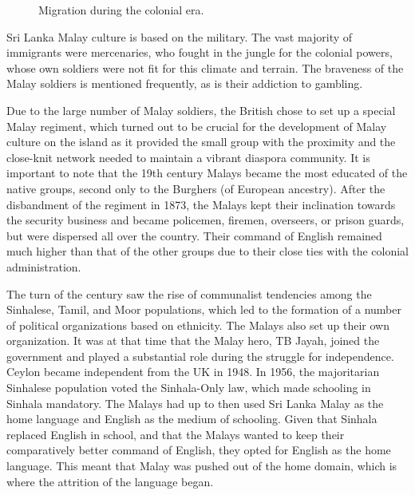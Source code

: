 \begin{figure}
\centering
{}
\caption{Migration during the colonial era.}
\end{figure}

Sri Lanka Malay culture is based on the military. The vast majority of immigrants were mercenaries, who fought in the jungle for the colonial powers, whose own soldiers were not fit for this climate and terrain. The braveness of the Malay soldiers is mentioned frequently, as is their addiction to gambling. 
 
Due to the large number of Malay soldiers, the British chose to set up  a special Malay regiment, which turned out to  be crucial for the development of Malay culture on the island \citep{Hussainmiya1987,Hussainmiya1990} as it provided the small group with the proximity and the close-knit network needed to maintain a vibrant diaspora community.  It is important to note that the 19th century Malays became the most educated of the native groups, second only to the Burghers (of European ancestry). After the disbandment of the regiment in 1873, the Malays kept their inclination towards the security  business and became policemen, firemen, overseers, or prison guards, but were dispersed all over the country. Their command of English remained much higher than that of the other groups due to their close ties with the colonial administration.

The turn of the century saw the rise of communalist tendencies among the Sinhalese, Tamil, and Moor populations, which led to the formation of a number of political organizations based on ethnicity. The Malays also set up their own  organization. It was at that time that the Malay hero, TB Jayah, joined the government and played a substantial role during the struggle for independence. Ceylon became independent from the UK in 1948. In 1956, the majoritarian Sinhalese population voted the Sinhala-Only law, which made schooling in Sinhala mandatory. The Malays had up to then used Sri Lanka Malay as the home language and English as the medium of schooling. Given that Sinhala replaced English in school, and that the Malays wanted to keep their comparatively better command of English, they opted for English as the home language. This meant that Malay was pushed out of the home domain, which is where the attrition of the language began. 


